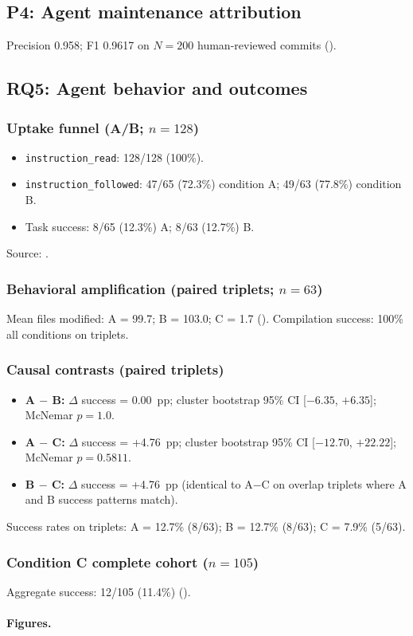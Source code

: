 \subsection{P4: Agent maintenance attribution}
Precision 0.958; F1 0.9617 on $N=200$ human-reviewed commits ().

\subsection{RQ5: Agent behavior and outcomes}

\subsubsection{Uptake funnel (A/B; $n=128$)}
\begin{itemize}
  \item \texttt{instruction\_read}: 128/128 (100\%).
  \item \texttt{instruction\_followed}: 47/65 (72.3\%) condition A; 49/63 (77.8\%) condition B.
  \item Task success: 8/65 (12.3\%) A; 8/63 (12.7\%) B.
\end{itemize}
Source: .

\subsubsection{Behavioral amplification (paired triplets; $n=63$)}
Mean files modified: A = 99.7; B = 103.0; C = 1.7 ().
Compilation success: 100\% all conditions on triplets.

\subsubsection{Causal contrasts (paired triplets)}
\begin{itemize}
  \item \textbf{A $-$ B:} $\Delta$ success = 0.00~pp; cluster bootstrap 95\% CI [$-6.35$, $+6.35$]; McNemar $p = 1.0$.
  \item \textbf{A $-$ C:} $\Delta$ success = +4.76~pp; cluster bootstrap 95\% CI [$-12.70$, $+22.22$]; McNemar $p = 0.5811$.
  \item \textbf{B $-$ C:} $\Delta$ success = +4.76~pp (identical to A$-$C on overlap triplets where A and B success patterns match).
\end{itemize}
Success rates on triplets: A = 12.7\% (8/63); B = 12.7\% (8/63); C = 7.9\% (5/63).

\subsubsection{Condition C complete cohort ($n=105$)}
Aggregate success: 12/105 (11.4\%) ().

\paragraph{Figures.}
